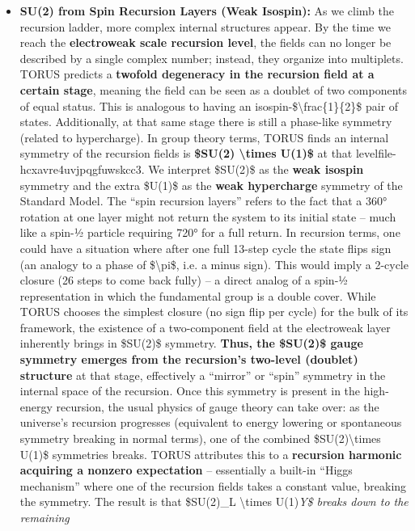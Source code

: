 \documentclass[]{article}
\begin{document}
\begin{itemize}
\item
  \textbf{SU(2) from Spin Recursion Layers (Weak Isospin):} As we climb
  the recursion ladder, more complex internal structures appear. By the
  time we reach the \textbf{electroweak scale recursion level}, the
  fields can no longer be described by a single complex number; instead,
  they organize into multiplets. TORUS predicts a \textbf{twofold
  degeneracy in the recursion field at a certain stage}, meaning the
  field can be seen as a doublet of two components of equal status​.
  This is analogous to having an
  isospin-\$\textbackslash{}frac\{1\}\{2\}\$ pair of states.
  Additionally, at that same stage there is still a phase-like symmetry
  (related to hypercharge). In group theory terms, TORUS finds an
  internal symmetry of the recursion fields is \textbf{\$SU(2)
  \textbackslash{}times U(1)\$} at that
  level​file-hcxavre4uvjpqgfuwskcc3. We interpret \$SU(2)\$ as the
  \textbf{weak isospin} symmetry and the extra \$U(1)\$ as the
  \textbf{weak hypercharge} symmetry of the Standard Model. The ``spin
  recursion layers'' refers to the fact that a 360° rotation at one
  layer might not return the system to its initial state -- much like a
  spin-½ particle requiring 720° for a full return. In recursion terms,
  one could have a situation where after one full 13-step cycle the
  state flips sign (an analogy to a phase of \$\textbackslash{}pi\$,
  i.e. a minus sign)​. This would imply a 2-cycle closure (26 steps to
  come back fully) -- a direct analog of a spin-½ representation in
  which the fundamental group is a double cover. While TORUS chooses the
  simplest closure (no sign flip per cycle) for the bulk of its
  framework, the existence of a two-component field at the electroweak
  layer inherently brings in \$SU(2)\$ symmetry. \textbf{Thus, the
  \$SU(2)\$ gauge symmetry emerges from the recursion's two-level
  (doublet) structure} at that stage, effectively a ``mirror'' or
  ``spin'' symmetry in the internal space of the recursion​. Once this
  symmetry is present in the high-energy recursion, the usual physics of
  gauge theory can take over: as the universe's recursion progresses
  (equivalent to energy lowering or spontaneous symmetry breaking in
  normal terms), one of the combined \$SU(2)\textbackslash{}times U(1)\$
  symmetries breaks. TORUS attributes this to a \textbf{recursion
  harmonic acquiring a nonzero expectation} -- essentially a built-in
  ``Higgs mechanism'' where one of the recursion fields takes a constant
  value, breaking the symmetry​. The result is that \$SU(2)\_L
  \textbackslash{}times U(1)\emph{Y\$ breaks down to the remaining
}
\end{itemize}
\end{document}
